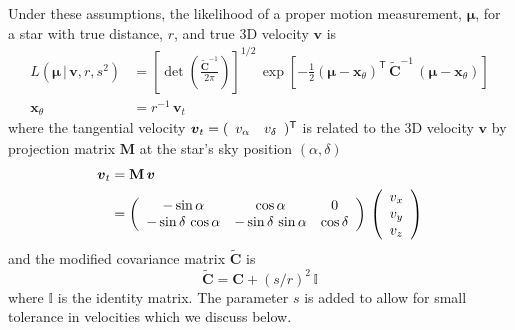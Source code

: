 \documentclass[manuscript, letterpaper]{aastex6}
\newcommand{\given}{\,|\,}
\newcommand{\transp}[1]{{#1}^{\!\mathsf{T}}}
\newcommand{\bs}[1]{\boldsymbol{#1}}
\newcommand{\mat}[1]{\mathbf{#1}}
\renewcommand{\vec}[1]{\bs{#1}}
\newcommand{\eye}{\mathbb{I}}
\begin{document}
Under these assumptions, the likelihood of a proper motion measurement,
$\bs{\mu}$, for a star with true distance, $r$, and true 3D velocity $\vec{v}$ is
\begin{align}
  L(\vec{\mu} \given \vec{v}, r, s^2) &=
    \left[\det\left(\frac{\tilde{\mat{C}}^{-1}}{2\pi}\right)\right]^{1/2} \,
    \exp \left[ -\frac{1}{2} \transp{\left(\vec{\mu} - \vec{x}_\theta \right)} \,
    \tilde{\mat{C}}^{-1} \,
    \left(\vec{\mu} - \vec{x}_\theta \right) \right] \label{eq:likefn} \\
  \vec{x}_\theta &= r^{-1} \, \vec{v}_t
\end{align}
where the tangential velocity $\vec{v}_t = (\begin{array}[t]{c c} v_\alpha & v_\delta\end{array})^\mathsf{T}$
is related to the 3D velocity
$\vec{v}$ by projection matrix $\mat{M}$ at the star's sky position
$(\alpha, \delta)$
\begin{align}
  \vec{v}_t &= \mat{M}\,\vec{v} \\
  & = \left(
      \begin{array}{c c c}
        -\sin\alpha & \cos\alpha & 0 \\
        -\sin\delta \, \cos\alpha & -\sin\delta \, \sin\alpha & \cos\delta
      \end{array}
    \right) \,
    \left(\begin{array}{c} v_x \\ v_y \\ v_z \end{array}\right) \label{eq:transformation}
\end{align}
and the modified covariance matrix $\tilde{\mat{C}}$ is
\begin{equation}
  \tilde{\mat{C}} = \mat{C} + (s/r)^2 \, \eye
\end{equation}
where $\eye$ is the identity matrix.
The parameter $s$ is added to allow for small tolerance in velocities which we discuss below.
\end{document}
